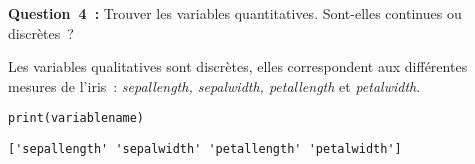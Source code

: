 \vspace{.5cm}

\noindent
\textbf{Question~4~:} Trouver les variables quantitatives. Sont-elles continues ou discrètes~? 
\vspace{.2cm}

Les variables qualitatives sont discrètes, elles correspondent aux différentes mesures de l'iris~: \textit{sepallength, sepalwidth, petallength} et \textit{petalwidth}.

\begin{lstlisting}[style=myPython, caption=Code Python pour obtenir les variables qualitatives, frame=lines]
print(variablename)
\end{lstlisting}

\begin{lstlisting}[style=myLog, caption=Résultat du code, frame=lines]
['sepallength' 'sepalwidth' 'petallength' 'petalwidth']
\end{lstlisting}

\vspace{.3cm}
